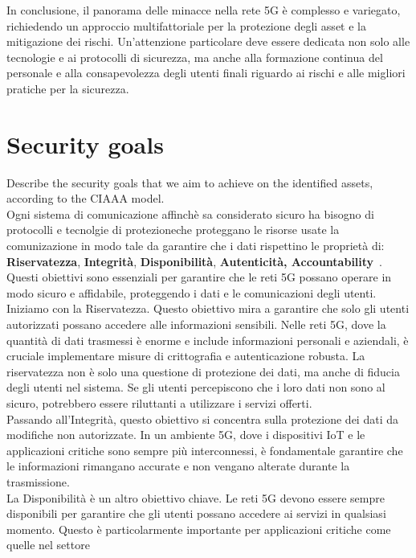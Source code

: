 \documentclass[english]{article}
\begin{document}
In conclusione, il panorama delle minacce nella rete 5G è complesso e
variegato, richiedendo un approccio multifattoriale per la protezione degli
asset e la mitigazione dei rischi. Un'attenzione particolare deve essere
dedicata non solo alle tecnologie e ai protocolli di sicurezza, ma anche alla
formazione continua del personale e alla consapevolezza degli utenti finali
riguardo ai rischi e alle migliori pratiche per la sicurezza.
\section{Security goals}
Describe the security goals that we aim to achieve on the identified assets,
according to the CIAAA model. \\ Ogni sistema di comunicazione affinchè sa
considerato sicuro ha bisogno di protocolli e tecnolgie di protezioneche
proteggano le risorse usate la comunizazione in modo tale da garantire che i
dati rispettino le proprietà di: \textbf{Riservatezza}, \textbf{Integrità},
\textbf{Disponibilità}, \textbf{Autenticità,
	\textbf{Accountability}}~\cite{mohan2022cyber}. \\ Questi obiettivi sono
essenziali per garantire che le reti 5G possano operare in modo sicuro e
affidabile, proteggendo i dati e le comunicazioni degli utenti. \\ Iniziamo con
la Riservatezza. Questo obiettivo mira a garantire che solo gli utenti
autorizzati possano accedere alle informazioni sensibili. Nelle reti 5G, dove
la quantità di dati trasmessi è enorme e include informazioni personali e
aziendali, è cruciale implementare misure di crittografia e autenticazione
robusta. La riservatezza non è solo una questione di protezione dei dati, ma
anche di fiducia degli utenti nel sistema. Se gli utenti percepiscono che i
loro dati non sono al sicuro, potrebbero essere riluttanti a utilizzare i
servizi offerti. \\ Passando all'Integrità, questo obiettivo si concentra sulla
protezione dei dati da modifiche non autorizzate. In un ambiente 5G, dove i
dispositivi IoT e le applicazioni critiche sono sempre più interconnessi, è
fondamentale garantire che le informazioni rimangano accurate e non vengano
alterate durante la trasmissione. \\ La Disponibilità è un altro obiettivo
chiave. Le reti 5G devono essere sempre disponibili per garantire che gli
utenti possano accedere ai servizi in qualsiasi momento. Questo è
particolarmente importante per applicazioni critiche come quelle nel settore
\end{document}
